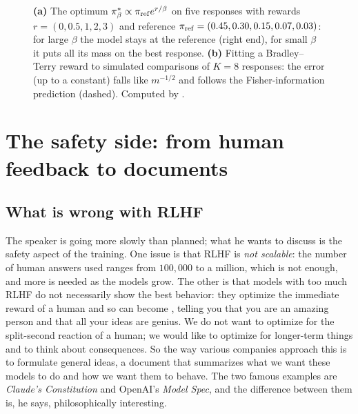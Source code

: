 \begin{figure}[tb]
\caption{\textbf{(a)} The optimum $\pi^*_\beta\propto\pi_{\mathrm{ref}} e^{r/\beta}$ on five responses with rewards $r=(0,0.5,1,2,3)$ and reference $\pi_{\mathrm{ref}}=(0.45,0.30,0.15,0.07,0.03)$: for large $\beta$ the model stays at the reference (right end), for small $\beta$ it puts all its mass on the best response. \textbf{(b)} Fitting a Bradley--Terry reward to simulated comparisons of $K=8$ responses: the error (up to a constant) falls like $m^{-1/2}$ and follows the Fisher-information prediction (dashed). Computed by .}
\label{fig:L6-bt}
\end{figure}

\section{The safety side: from human feedback to documents}\label{sec:L6-safety}
\subsection{What is wrong with RLHF}\label{sec:L6-rlhflimits}
The speaker is going more slowly than planned; what he wants to discuss is the safety aspect of the training. One issue is that RLHF is \emph{not scalable}: the number of human answers used ranges from $100{,}000$ to a million, which is not enough, and more is needed as the models grow. The other is that models with too much RLHF do not necessarily show the best behavior: they optimize the immediate reward of a human and so can become , telling you that you are an amazing person and that all your ideas are genius. We do not want to optimize for the split-second reaction of a human; we would like to optimize for longer-term things and to think about consequences. So the way various companies approach this is to formulate general ideas, a document that summarizes what we want these models to do and how we want them to behave. The two famous examples are \emph{Claude's Constitution} and OpenAI's \emph{Model Spec}, and the difference between them is, he says, philosophically interesting.

